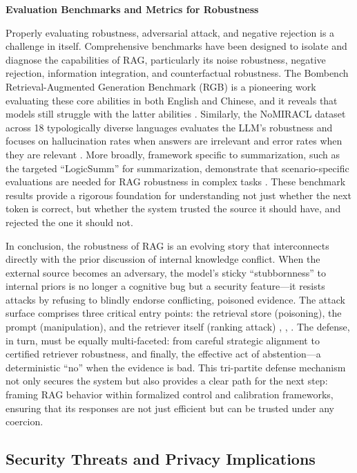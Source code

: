 \documentclass[11pt]{article}
\begin{document}
\textbf{Evaluation Benchmarks and Metrics for Robustness}

Properly evaluating robustness, adversarial attack, and negative rejection is a challenge in itself. Comprehensive benchmarks have been designed to isolate and diagnose the capabilities of RAG, particularly its noise robustness, negative rejection, information integration, and counterfactual robustness. The Bombench Retrieval-Augmented Generation Benchmark (RGB) is a pioneering work evaluating these core abilities in both English and Chinese, and it reveals that models still struggle with the latter abilities \cite{ref34}. Similarly, the NoMIRACL dataset across 18 typologically diverse languages evaluates the LLM's robustness and focuses on hallucination rates when answers are irrelevant and error rates when they are relevant \cite{ref265}. More broadly, framework specific to summarization, such as the targeted ``LogicSumm'' for summarization, demonstrate that scenario-specific evaluations are needed for RAG robustness in complex tasks \cite{ref266}. These benchmark results provide a rigorous foundation for understanding not just whether the next token is correct, but whether the system trusted the source it should have, and rejected the one it should not.

In conclusion, the robustness of RAG is an evolving story that interconnects directly with the prior discussion of internal knowledge conflict. When the external source becomes an adversary, the model's sticky ``stubbornness'' to internal priors is no longer a cognitive bug but a security feature---it resists attacks by refusing to blindly endorse conflicting, poisoned evidence. The attack surface comprises three critical entry points: the retrieval store (poisoning), the prompt (manipulation), and the retriever itself (ranking attack) \cite{ref258}, \cite{ref257}, \cite{ref261}. The defense, in turn, must be equally multi-faceted: from careful strategic alignment to certified retriever robustness, and finally, the effective act of abstention---a deterministic ``no'' when the evidence is bad. This tri-partite defense mechanism not only secures the system but also provides a clear path for the next step: framing RAG behavior within formalized control and calibration frameworks, ensuring that its responses are not just efficient but can be trusted under any coercion.

\subsection{Security Threats and Privacy Implications}
\end{document}
